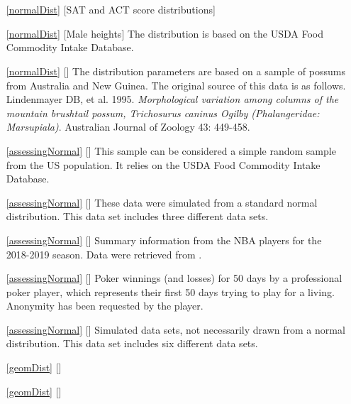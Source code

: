 \section{}
\label{ch_distributions_data}

\begin{itemize}
\item[\ref{normalDist}]
    [SAT and ACT score distributions]
\item[\ref{normalDist}]
    [Male heights]
    The distribution is based on the
    USDA Food Commodity Intake Database.
\item[\ref{normalDist}]
    [\datalink{possum}]
    The distribution parameters are based on a sample
    of possums from Australia and New Guinea.
    The original source of this data is as follows.
    Lindenmayer DB, et al. 1995.
    \emph{Morphological variation among columns of the
        mountain brushtail possum, Trichosurus caninus
        Ogilby (Phalangeridae: Marsupiala)}.
    Australian Journal of Zoology 43: 449-458.

\item[\ref{assessingNormal}]
    [\datalink{male\_heights\_fcid}]
    This sample can be considered a simple random sample
    from the US population.
    It relies on the USDA Food Commodity Intake Database.
\item[\ref{assessingNormal}]
    [\datalink{simulated\_normal}]
    These data were simulated from a standard normal distribution.
    This data set includes three different data sets.
\item[\ref{assessingNormal}]
    [\datalink{nba\_players\_19}]
    Summary information from the NBA players for the
    2018-2019 season.
    Data were retrieved from
    .
\item[\ref{assessingNormal}]
    [\datalink{poker}]
    Poker winnings (and losses) for 50 days by a professional
    poker player, which represents their first 50 days trying
    to play for a living.
    Anonymity has been requested by the player.
\item[\ref{assessingNormal}]
    [\datalink{simulated\_dist}]
    Simulated data sets,
    not necessarily drawn from a normal distribution.
    This data set includes six different data sets.

\item[\ref{geomDist}]
    [\datalink{}]
\item[\ref{geomDist}]
    [\datalink{}]


\end{itemize}
